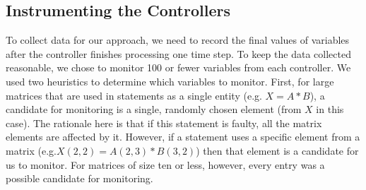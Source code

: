 %
\subsection{Instrumenting the Controllers}
To collect data for our approach, we need to record the final values of variables after the controller finishes processing one time step. To keep the data collected reasonable, we chose to monitor 100 or fewer variables from each controller. We used two heuristics to determine which variables to monitor. First, for large matrices that are used in statements as a single entity (e.g. $X = A*B$), a candidate for monitoring is a single, randomly chosen element (from $X$ in this case). The rationale here is that if this statement is faulty, all the matrix elements are affected by it. However, if a statement uses a specific element from a matrix (e.g.$X(2, 2) = A(2, 3) * B(3, 2)$) then that element is a candidate for us to monitor. For matrices of size ten or less, however, every entry was a possible candidate for monitoring.

